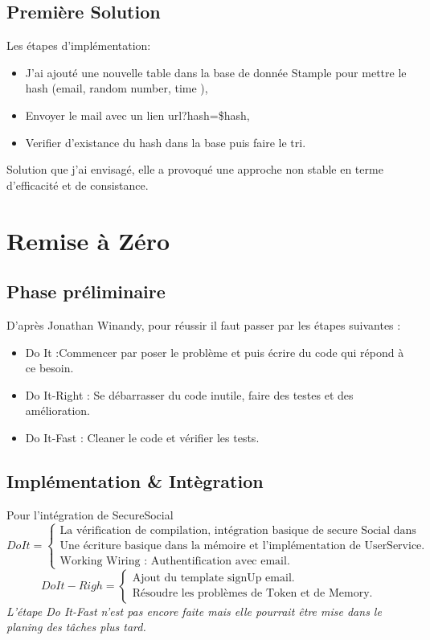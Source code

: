 \subsection{Première Solution}
Les étapes d'implémentation: 
\begin{itemize}
\item J'ai ajouté une nouvelle table dans la base de donnée Stample pour mettre le hash (email, random number, time ),
\item Envoyer le mail avec un lien url?hash=\$hash,
\item Verifier d'existance du hash dans la base puis faire le tri.

\end{itemize}
Solution que j'ai envisagé, elle a provoqué une approche non stable en terme d'efficacité et de consistance.
\section{Remise à Zéro}
\subsection{Phase préliminaire}
D'après Jonathan Winandy, pour réussir il faut passer par les étapes suivantes :
\begin{itemize}

\item Do It :Commencer par poser le problème et puis écrire du code qui répond à ce besoin.  
\item Do It-Right : Se débarrasser du code inutile, faire des testes et des amélioration.
\item Do It-Fast : Cleaner le code et vérifier les tests.
\end{itemize}
\subsection{Implémentation \& Intègration}
Pour l'intégration de SecureSocial 
\[
Do It =
\begin{cases}
\text{La vérification de compilation, intégration basique de secure Social dans Stample.}\\
\text{Une écriture basique dans la mémoire et l'implémentation de UserService.}\\
\text{Working Wiring : Authentification avec email.}
\end{cases}
\]
\[
Do It-Righ =
\begin{cases}
\text{Ajout du template signUp email.}\\
\text{Résoudre les problèmes de Token et de Memory.}
\end{cases}
\]
\textit{L'étape Do It-Fast n'est pas encore faite mais elle pourrait être mise dans le planing des tâches plus tard. }
